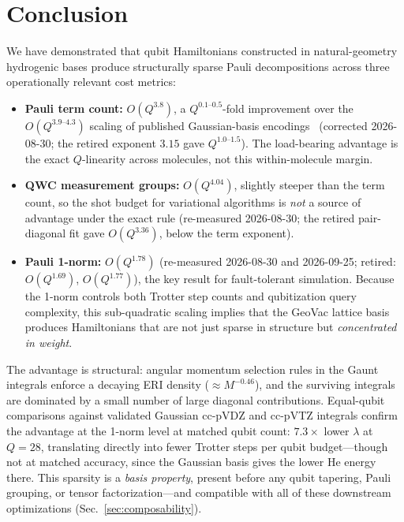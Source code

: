 \documentclass[aps,pra,twocolumn,superscriptaddress,longbibliography]{revtex4-2}
\newcommand{\gvq}[2]{#2}
\begin{document}
\section{Conclusion}
\label{sec:conclusion}

We have demonstrated that qubit Hamiltonians constructed in
natural-geometry hydrogenic bases produce structurally sparse Pauli decompositions
across three operationally relevant cost metrics:
\begin{itemize}
\item \textbf{Pauli term count:} $O(Q^{3.8})$, a $Q^{0.1\text{--}0.5}$-fold
  improvement over the $O(Q^{3.9\text{--}4.3})$ scaling of published
  Gaussian-basis encodings~\cite{trenev2025} (corrected 2026-08-30; the
  retired exponent $3.15$ gave $Q^{1.0\text{--}1.5}$).  The load-bearing
  advantage is the exact $Q$-linearity across molecules, not this
  within-molecule margin.
\item \textbf{QWC measurement groups:} $O(Q^{4.04})$, slightly steeper
  than the term count, so the shot budget for variational algorithms is
  \emph{not} a source of advantage under the exact rule (re-measured
  2026-08-30; the retired pair-diagonal fit gave $O(Q^{3.36})$, below the
  term exponent).
\item \textbf{Pauli 1-norm:} $O(Q^{1.78})$ (re-measured 2026-08-30 and
  2026-09-25; retired: $O(Q^{1.69})$, $O(Q^{1.77})$), the key result for
  fault-tolerant simulation.  Because the 1-norm controls both
  Trotter step counts and qubitization query complexity, this
  sub-quadratic scaling implies that the GeoVac lattice basis
  produces Hamiltonians that are not just sparse in structure but
  \emph{concentrated in weight}.
\end{itemize}
The advantage is structural: angular momentum selection rules in the
Gaunt integrals enforce a decaying ERI density
($\approx M^{\gvq{eri_decay_4pt}{-0.46}}$), and the surviving
integrals are dominated by a small number of large diagonal
contributions.  Equal-qubit comparisons against validated Gaussian
cc-pVDZ and cc-pVTZ integrals confirm the advantage at the 1-norm
level at matched qubit count: $7.3\times$ lower $\lambda$ at $Q = 28$,
translating directly into fewer Trotter steps per qubit budget---though
not at matched accuracy, since the Gaussian basis gives the lower He
energy there.  This sparsity is a \emph{basis property},
present before any qubit tapering, Pauli grouping, or tensor
factorization---and compatible with all of these downstream
optimizations (Sec.~\ref{sec:composability}).
\end{document}

